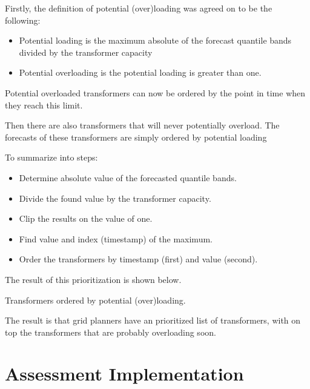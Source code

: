 \documentclass[letterpaper,10pt,english]{sphinxmanual}
\let\sphinxpxdimen\pdfpxdimen\else\newdimen\sphinxpxdimen
\begin{document}
Firstly, the definition of potential (over)loading was agreed on to be the following:
\begin{itemize}
\item {} 
Potential loading is the maximum absolute of the forecast quantile bands divided by the transformer capacity

\item {} 
Potential overloading is the potential loading is greater than one.

\end{itemize}

Potential overloaded transformers can now be ordered by the point in time when they reach this limit.

Then there are also transformers that will never potentially overload.
The forecasts of these transformers are simply ordered by potential loading

To summarize into steps:
\begin{itemize}
\item {} 
Determine absolute value of the forecasted quantile bands.

\item {} 
Divide the found value by the transformer capacity.

\item {} 
Clip the results on the value of one.

\item {} 
Find value and index (timestamp) of the maximum.

\item {} 
Order the transformers by timestamp (first) and value (second).

\end{itemize}
\begin{description}
\item[{The result of this prioritization is shown below.}] \leavevmode
\noindent{\hspace*{\fill}\sphinxincludegraphics[width=300\sphinxpxdimen]{{ordered_transformers}.png}\hspace*{\fill}}

\end{description}

Transformers ordered by potential (over)loading.

The result is that grid planners have an prioritized list of transformers, with on top the transformers that are probably overloading soon.


\section{Assessment Implementation}
\label{\detokenize{evaluation:assessment-implementation}}
\end{document}
